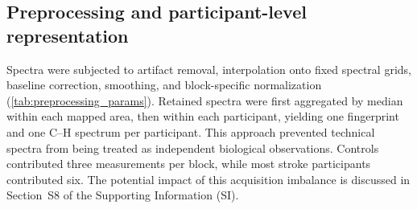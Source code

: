 \documentclass[preprint,12pt]{elsarticle}
\begin{document}
\subsection{Preprocessing and participant-level representation} \label{subsec:preprocessing}

Spectra were subjected to artifact removal, interpolation onto fixed spectral grids, baseline correction, smoothing, and block-specific normalization (\cref{tab:preprocessing_params}). Retained spectra were first aggregated by median within each mapped area, then within each participant, yielding one fingerprint and one C--H spectrum per participant. This approach prevented technical spectra from being treated as independent biological observations. Controls contributed three measurements per block, while most stroke participants contributed six. The potential impact of this acquisition imbalance is discussed in Section~S8 of the Supporting Information (SI).
\end{document}
